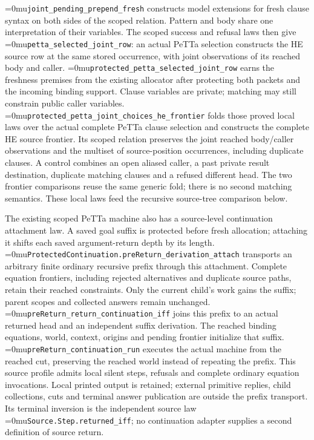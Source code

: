 \documentclass[11pt,a4paper]{article}
\newcommand{\name}[1]{\textup{\Urlmuskip=0mu\relax\nolinkurl{#1}}}
\begin{document}
\name{joint_pending_prepend_fresh} constructs model extensions for fresh
clause syntax on both sides of the scoped relation. Pattern and body share
one interpretation of their variables. The scoped success and refusal laws
then give \name{petta_selected_joint_row}: an actual PeTTa selection
constructs the HE source row at the same stored occurrence, with joint
observations of its reached body and caller.
\name{protected_petta_selected_joint_row} earns the freshness premises from
the existing allocator after protecting both packets and the incoming
binding support. Clause variables are private; matching may still constrain
public caller variables.
\name{protected_petta_joint_choices_he_frontier} folds those proved local
laws over the actual complete PeTTa clause selection and constructs the
complete HE source frontier. Its scoped relation preserves the joint reached
body/caller observations and the multiset of source-position occurrences,
including duplicate clauses. A control combines an open aliased caller,
a past private result destination, duplicate matching clauses and a refused
different head. The two frontier comparisons reuse the same generic fold;
there is no second matching semantics. These local laws feed the recursive
source-tree comparison below.

The existing scoped PeTTa machine also has a source-level continuation
attachment law. A saved goal suffix is protected before fresh allocation;
attaching it shifts each saved argument-return depth by its length.
\name{ProtectedContinuation.preReturn_derivation_attach} transports an
arbitrary finite ordinary recursive prefix through this attachment. Complete
equation frontiers, including rejected alternatives and duplicate source
paths, retain their reached constraints. Only the current child's work gains
the suffix; parent scopes and collected answers remain unchanged.
\name{preReturn_return_continuation_iff} joins this prefix to an actual returned
head and an independent suffix derivation. The reached binding equations,
world, context, origins and pending frontier initialize that suffix.
\name{preReturn_continuation_run} executes the actual machine from the
reached cut, preserving the reached world instead of repeating the prefix.
This source profile admits local silent steps, refusals and complete ordinary
equation invocations. Local printed output is retained; external primitive
replies, child collections, cuts and terminal answer publication are outside
the prefix transport. Its terminal inversion is the independent source law
\name{Source.Step.returned_iff}; no continuation adapter supplies a second
definition of source return.
\end{document}
